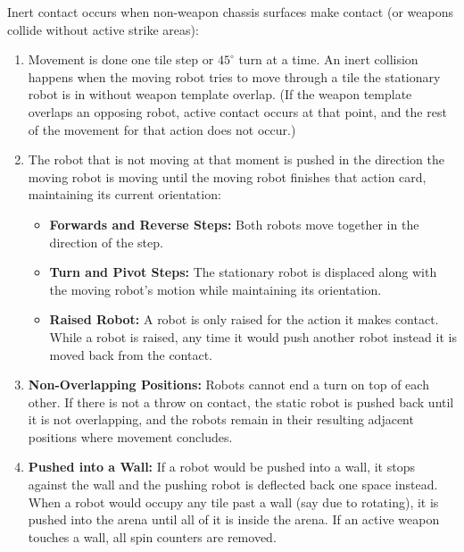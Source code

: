 \documentclass[11pt,a4paper]{article}
\begin{document}
Inert contact occurs when non-weapon chassis surfaces make contact (or weapons collide without active strike areas):
\begin{enumerate}[leftmargin=*, noitemsep, topsep=1pt]
  \item Movement is done one tile step or $45^\circ$ turn at a time. An inert collision happens when the moving robot tries to move through a tile the stationary robot is in without weapon template overlap. (If the weapon template overlaps an opposing robot, active contact occurs at that point, and the rest of the movement for that action does not occur.)
  \item The robot that is not moving at that moment is pushed in the direction the moving robot is moving until the moving robot finishes that action card, maintaining its current orientation:
  \begin{itemize}[noitemsep, topsep=1pt]
    \item \textbf{Forwards and Reverse Steps:} Both robots move together in the direction of the step.
    \item \textbf{Turn and Pivot Steps:} The stationary robot is displaced along with the moving robot's motion while maintaining its orientation.
    \item \textbf{Raised Robot:} A robot is only raised for the action it makes contact. While a robot is raised, any time it would push another robot instead it is moved back from the contact.
  \end{itemize}
  \item \textbf{Non-Overlapping Positions:} Robots cannot end a turn on top of each other. If there is not a throw on contact, the static robot is pushed back until it is not overlapping, and the robots remain in their resulting adjacent positions where movement concludes.
  \item \textbf{Pushed into a Wall:} If a robot would be pushed into a wall, it stops against the wall and the pushing robot is deflected back one space instead. When a robot would occupy any tile past a wall (say due to rotating), it is pushed into the arena until all of it is inside the arena. If an active weapon touches a wall, all spin counters are removed.
\end{enumerate}
\end{document}
